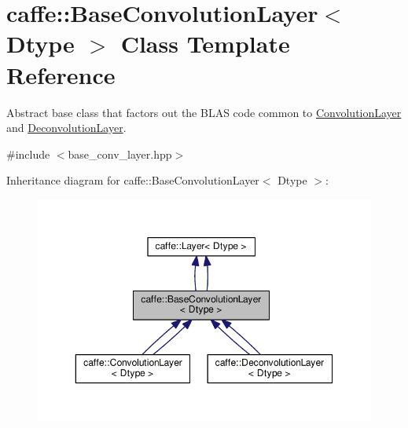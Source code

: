 \hypertarget{classcaffe_1_1_base_convolution_layer}{}\section{caffe\+:\+:Base\+Convolution\+Layer$<$ Dtype $>$ Class Template Reference}
\label{classcaffe_1_1_base_convolution_layer}


Abstract base class that factors out the B\+L\+AS code common to \mbox{\hyperlink{classcaffe_1_1_convolution_layer}{Convolution\+Layer}} and \mbox{\hyperlink{classcaffe_1_1_deconvolution_layer}{Deconvolution\+Layer}}.  




{\ttfamily \#include $<$base\+\_\+conv\+\_\+layer.\+hpp$>$}



Inheritance diagram for caffe\+:\+:Base\+Convolution\+Layer$<$ Dtype $>$\+:
\nopagebreak
\begin{figure}[H]
\begin{center}
\leavevmode
\includegraphics[width=350pt]{classcaffe_1_1_base_convolution_layer__inherit__graph}
\end{center}
\end{figure}
